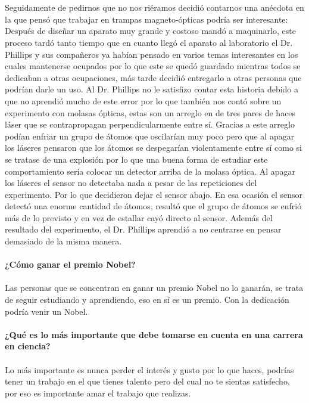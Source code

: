 \documentclass[10pt,letterpaper]{article}
\begin{document}
\\
\\
Seguidamente de pedirnos que no nos riéramos decidió contarnos una anécdota en la que pensó que trabajar en trampas magneto-ópticas podría ser interesante: Después de diseñar un aparato muy grande y costoso mandó a maquinarlo, este proceso tardó tanto tiempo que en cuanto llegó el aparato al laboratorio el Dr. Phillips y sus compañeros ya habían pensado en varios temas interesantes en los cuales mantenerse ocupados por lo que este se quedó guardado mientras todos se dedicaban a otras ocupaciones, más tarde decidió entregarlo a otras personas que podrían darle un uso. Al Dr. Phillips no le satisfizo contar esta historia debido a que no aprendió mucho de este error por lo que también nos contó sobre un experimento con molasas ópticas, estas son un arreglo en de tres pares de haces láser que se contrapropagan perpendicularmente entre sí. Gracias a este arreglo podían enfriar un grupo de átomos que oscilarían muy poco pero que al apagar los láseres pensaron que los átomos se despegarían violentamente entre sí como si se tratase de una explosión por lo que una buena forma de estudiar este comportamiento sería colocar un detector arriba de la molasa óptica. Al apagar los láseres el sensor no detectaba nada a pesar de las repeticiones del experimento. Por lo que decidieron dejar el sensor abajo. En esa ocasión el sensor detectó una enorme cantidad de átomos, resultó que el grupo de átomos se enfrió más de lo previsto y en vez de estallar cayó directo al sensor. Además del resultado del experimento, el Dr. Phillips aprendió a no centrarse en pensar demasiado de la misma manera.
\\
\\
\textbf{¿Cómo ganar el premio Nobel?}
\\
\\
Las personas que se concentran en ganar un premio Nobel no lo ganarán, se trata de seguir estudiando y aprendiendo, eso en sí es un premio. Con la dedicación podría venir un Nobel.
\\
\\
\textbf{¿Qué es lo más importante que debe tomarse en cuenta en una carrera en ciencia?}
\\
\\
Lo más importante es nunca perder el interés y gusto por lo que haces, podrías tener un trabajo en el que tienes talento pero del cual no te sientas satisfecho, por eso es importante amar el trabajo que realizas.
\\
\\
\end{document}
